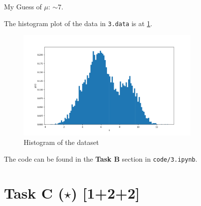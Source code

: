 My Guess of $\mu$: $\sim7$.

The histogram plot of the data in \texttt{3.data} is at \ref{fig_a3b}.

\begin{figure}[H]
    \centering
    \includegraphics[width=0.8\textwidth]{assets/images/a3b.png}
    \caption{Histogram of the dataset}
    \label{fig_a3b}
\end{figure}

The code can be found in the \textbf{Task B} section in \texttt{code/3.ipynb}.

\section*{\colS{$\S$} Task C ($\star$) \hfill \normalfont \large [1+2+2]}

